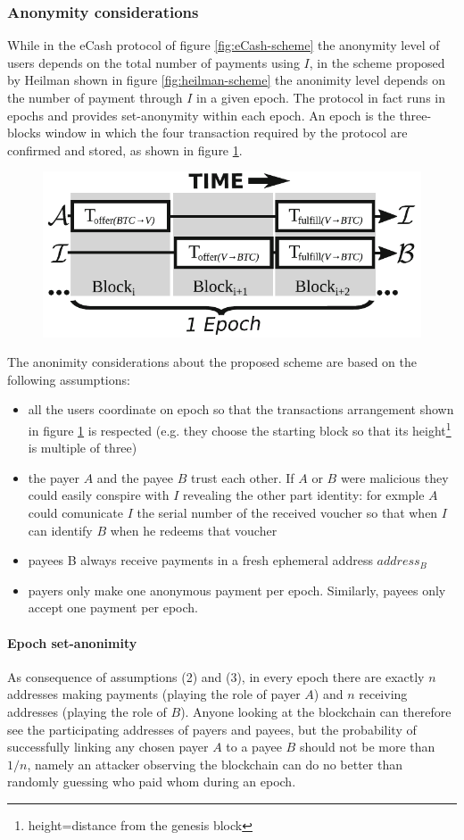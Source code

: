 \subsubsection{Anonymity considerations} While in the eCash protocol of figure
\ref{fig:eCash-scheme} the anonymity level of users depends on the total number
of payments using $I$, in the scheme proposed by Heilman shown in figure \ref{fig:heilman-scheme} the anonimity level
depends on the number of payment through $I$ in a given epoch. The protocol in
fact runs in epochs and provides set-anonymity within each epoch. An epoch is the
three-blocks window in which the four transaction required by the protocol are
confirmed and stored, as shown in figure \ref{fig:epochs}.
\begin{figure}[!htb]
	\centering
	\includegraphics[width=0.6\linewidth]{img/epochs.png}
	\caption{}
	\label{fig:epochs}
\end{figure}

The anonimity considerations about the proposed scheme are based on the following
assumptions:
\begin{itemize}
  \item all the users coordinate on epoch so that the transactions arrangement
  shown in figure \ref{fig:epochs} is respected (e.g. they choose the starting
  block so that its height\footnote{height=distance from the genesis block}
  is multiple of three)
  \item the payer $A$ and the payee $B$ trust each other. If $A$ or $B$ were malicious
  they could easily conspire with $I$ revealing the other part identity: for exmple
  $A$ could comunicate $I$ the serial number of the received voucher so that when
  $I$ can identify $B$ when he redeems that voucher
  \item payees B always receive payments in a fresh ephemeral address $address_B$
  \item payers only make one anonymous payment per epoch. Similarly, payees only
  accept one payment per epoch.
\end{itemize}

\paragraph{Epoch set-anonimity} As consequence of assumptions (2) and (3), in
every epoch there are exactly $n$ addresses making payments (playing the role of
payer $A$) and $n$ receiving addresses (playing the role of $B$). Anyone looking
at the blockchain can therefore see the participating addresses of payers and
payees, but the probability of successfully linking any chosen payer $A$ to a
payee $B$ should not be more than $1/n$, namely an attacker observing the
blockchain can do no better than randomly guessing who paid whom during an epoch.

